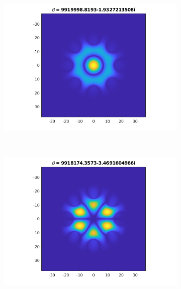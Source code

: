 \documentclass[]{article}
\begin{document}
\begin{figure}[htb]
\begin{subfigure}{0.3\textwidth}
	\end{subfigure}
	~
	\begin{subfigure}{0.3\textwidth}
		\includegraphics[width=\textwidth]{Figures/LP02}
	\end{subfigure}
	\\
	\begin{subfigure}{0.3\textwidth}
		\includegraphics[width=\textwidth]{Figures/LP31a}
	\end{subfigure}
	~
	\begin{subfigure}{0.3\textwidth}

\end{subfigure}
\end{figure}
\end{document}
